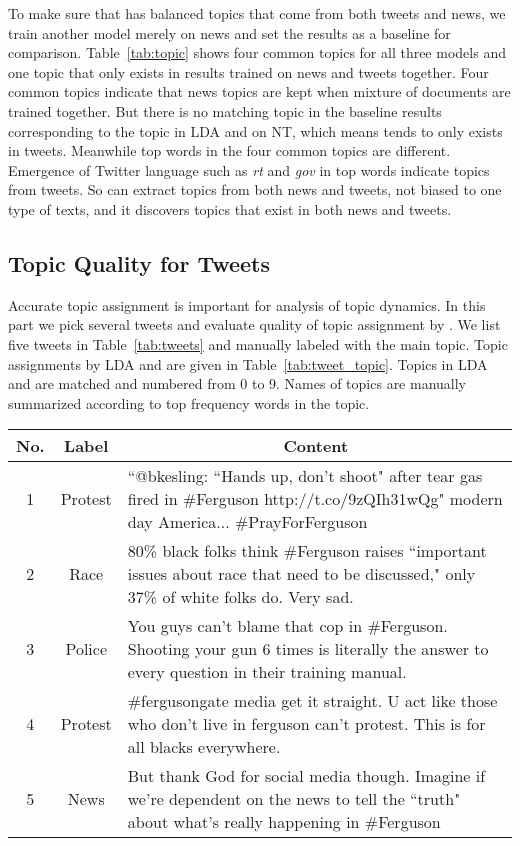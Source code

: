 To make sure that \stlda has balanced topics that come from both tweets and news, we train another model merely on news and set the results as a baseline for comparison. Table~\ref{tab:topic} shows four common topics for all three models and one topic that only exists in results trained on news and tweets together. Four common topics indicate that news topics are kept when mixture of documents are trained together. But there is no matching topic in the baseline results corresponding to the topic \pray in LDA and \stlda on NT, which means \pray tends to only exists in tweets. Meanwhile top words in the four common topics are different. Emergence of Twitter language such as \emph{rt} and \emph{gov} in top words indicate topics from tweets. So \stlda can extract topics from both news and tweets, not biased to one type of texts, and it discovers topics that exist in both news and tweets.

\subsection{Topic Quality for Tweets}
\label{subsec:intrinsic}
Accurate topic assignment is important for analysis of topic dynamics. In this part we pick several tweets and evaluate quality of topic assignment by \stlda. We list five tweets in Table~\ref{tab:tweets} and manually labeled with the main topic. Topic assignments by LDA and \stlda are given in Table~\ref{tab:tweet_topic}. Topics in LDA and \stlda are matched and numbered from 0 to 9. Names of topics are manually summarized according to top frequency words in the topic.

\begin{table*}[htpb]
\centering
\begin{tabular}{|c|c|p{13cm}|}
\hline
\bf No. & \bf Label & \multicolumn{1}{c|}{\bf Content}\\ \hline
1 & Protest & ``@bkesling: ``Hands up, don't shoot" after tear gas fired in \#Ferguson http://t.co/9zQIh31wQg" modern day America...  \#PrayForFerguson\\ \hline
2 & Race & 80\% black folks think \#Ferguson raises ``important issues about race that need to be discussed," only 37\% of white folks do. Very sad.\\ \hline
3 & Police & You guys can't blame that cop in \#Ferguson. Shooting your gun 6 times is literally the answer to every question in their training manual.\\ \hline
4 & Protest & \#fergusongate media get it straight. U act like those who don't live in ferguson can't protest. This is for all blacks everywhere.\\ \hline
5 & News & But thank God for social media though. Imagine if we're dependent on the news to tell the ``truth" about what's really happening in \#Ferguson\\ \hline
\end{tabular}
\caption{Tweet Examples}\label{tab:tweets}
\end{table*}


